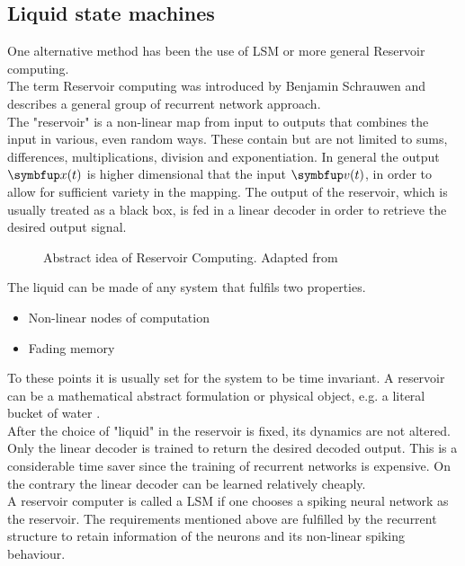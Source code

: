 \subsection{Liquid state machines}
One alternative method has been the use of \ac{LSM} or more general Reservoir computing.\\
The term Reservoir computing was introduced by Benjamin Schrauwen and describes a general group of recurrent network approach\cite{verstraeten_experimental_2007}.\\
The "reservoir" is a non-linear map from input to outputs that combines the input in various, even random ways. These contain but are not limited to sums, differences, multiplications, division and exponentiation. In general the output $\bmu{x}(t)$ is higher dimensional that the input $\bmu{v}(t)$, in order to allow for sufficient variety in the mapping. The output of the reservoir, which is usually treated as a black box, is fed in a linear decoder in order to retrieve the desired output signal.\\
\begin{figure}
	\centering
	
	\caption{Abstract idea of Reservoir Computing. Adapted from \cite{cooper_liquid_2011}}
	\label{fig:reservoir_computing}
\end{figure}
The liquid can be made of any system that fulfils two properties.\\
\begin{itemize}
	\item Non-linear nodes of computation
	\item Fading memory
\end{itemize}
To these points it is usually set for the system to be time invariant\cite{cooper_liquid_2011}.
A reservoir can be a mathematical abstract formulation or physical object, e.g. a literal bucket of water \cite{tanaka_recent_2019}.\\
After the choice of "liquid" in the reservoir is fixed, its dynamics are not altered. Only the linear decoder is trained to return the desired decoded output. This is a considerable time saver since the training of recurrent networks is expensive. On the contrary the linear decoder can be learned relatively cheaply.\\
A reservoir computer is called a \ac{LSM} if one chooses a spiking neural network as the reservoir. The requirements mentioned above are fulfilled by the recurrent structure to retain information of the neurons and its non-linear spiking behaviour.\\
